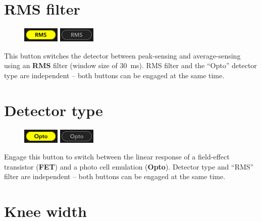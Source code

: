\newpage %

\section{RMS filter}

\begin{figure}
  \includegraphics[scale=\screenshotscale,clip]{include/images/button_rms_on.png}
  \newline \vspace{-0.9\baselineskip}
  \includegraphics[scale=\screenshotscale,clip]{include/images/button_rms_off.png}
\end{figure}

This button switches the detector between peak-sensing and
average-sensing using an \textbf{RMS} filter (window size of
\SI{30}{\milli\second}).  RMS filter and the ``Opto'' detector type
are independent -- both buttons can be engaged at the same time.

\section{Detector type}

\begin{figure}
  \includegraphics[scale=\screenshotscale,clip]{include/images/button_opto_on.png}
  \newline \vspace{-0.9\baselineskip}
  \includegraphics[scale=\screenshotscale,clip]{include/images/button_opto_off.png}
\end{figure}

Engage this button to switch between the linear response of a
field-effect transistor (\textbf{FET}) and a photo cell emulation
(\textbf{Opto}).  Detector type and ``RMS'' filter are independent --
both buttons can be engaged at the same time.

\section{Knee width}

